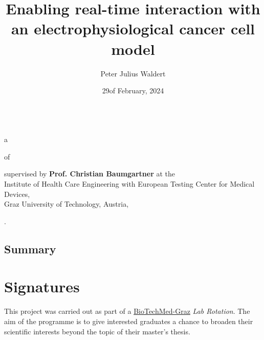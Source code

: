 \documentclass[10pt]{article}
\title{Enabling real-time interaction with an electrophysiological cancer cell model}
\author{Peter Julius Waldert}
\date{29\th of February, 2024}
\begin{document}
  \makeatletter
  \begin{center}
    {\Huge \@title} \\
    a\hspace{.4em}{\large BioTechMed-Graz Lab Rotation Report}
    \vspace{.5cm}

    of\hspace{.5em}{\large \@author}
    \vspace{.3cm}

    supervised by \textbf{Prof. Christian Baumgartner} at the \\
    Institute of Health Care Engineering with European Testing Center for Medical Devices, \\
    Graz University of Technology, Austria,
    \vspace{.3cm}

    {\@date}.
  \end{center}
  \makeatother

  \begin{multicols}{2}
    \section{Summary}
    

    
  \end{multicols}
  \pagebreak

  \section*{Signatures}
  This project was carried out as part of a \href{https://biotechmedgraz.at}{BioTechMed-Graz} \textit{Lab Rotation}. The aim of the programme is to give interested graduates a chance to broaden their scientific interests beyond the topic of their master's thesis.

  \vspace{4.5cm}

  \vspace{3cm}

  \pagebreak
  \printbibliography

\end{document}
